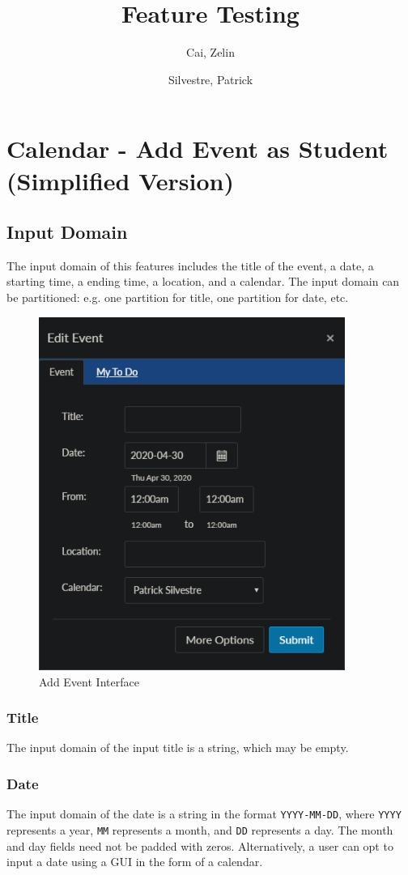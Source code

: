 \documentclass[10pt,letterpaper]{article}
\title{Feature Testing}
\author{
	Cai, Zelin\\
	\and
	Silvestre, Patrick\\
}
\date{}
\begin{document}
\maketitle
\section{Calendar - Add Event as Student (Simplified Version)}
\subsection{Input Domain}
The input domain of this features includes the title of the event, a date, a starting time, a ending time, a location, and a calendar. The input domain can be partitioned: e.g. one partition for title, one partition for date, etc.

\begin{figure}[h!]
	\centerline{\includegraphics[width=10cm]{screenshots/edit-event.png}}
	\caption{Add Event Interface}
\end{figure}

\newpage
\subsubsection{Title}
The input domain of the input title is a string, which may be empty.

\subsubsection{Date}
The input domain of the date is a string in the format \texttt{YYYY-MM-DD}, where \texttt{YYYY} represents a year, \texttt{MM} represents a month, and \texttt{DD} represents a day. The month and day fields need not be padded with zeros. Alternatively, a user can opt to input a date using a GUI in the form of a calendar.
\end{document}

